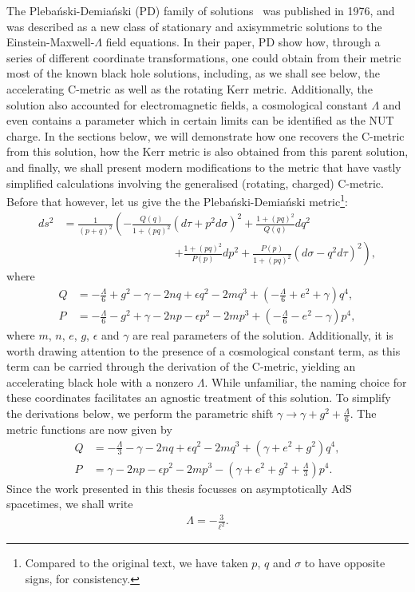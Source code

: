 \documentclass[
twoside,
openright,
frontopenright
]{dmathesis}
\newcommand{\nn}{\nonumber}
\begin{document}
The Pleba\'nski-Demia\'nski (PD) family of solutions~\cite{Plebanski:1976gy} was
published in 1976, and was described as a new class of stationary and
axisymmetric solutions to the Einstein-Maxwell-$\Lambda$ field equations. In
their paper, PD show how, through a series of different coordinate
transformations, one could obtain from their metric most of the known black hole
solutions, including, as we shall see below, the accelerating C-metric as well
as the rotating Kerr metric. Additionally, the solution also accounted for
electromagnetic fields, a cosmological constant $\Lambda$ and even contains a
parameter which in certain limits can be identified as the NUT charge. In the
sections below, we will demonstrate how one recovers the C-metric from this
solution, how the Kerr metric is also obtained from this parent solution, and
finally, we shall present modern modifications to the metric that have vastly
simplified calculations involving the generalised (rotating, charged)
C-metric. Before that however, let us give the the Pleba\'nski-Demia\'nski
metric\footnote{Compared to the original text, we have taken $p$, $q$ and
  $\sigma$ to have opposite signs, for consistency.}:
\begin{align}
  \label{eq:PD}
  ds^2 &= \frac{1}{(p + q)^2} \left( - \frac{Q(q)}{1+(pq)^2}(d\tau + p^2
         d\sigma)^2 + \frac{1+(pq)^2}{Q(q)}dq^2 \right.\nn\\
  &\hspace{10em}\left.+ \frac{1+(pq)^2}{P(p)}dp^2 +
         \frac{P(p)}{1+(pq)^2}(d\sigma - q^2 d\tau)^2 \right), 
\end{align}
where
\begin{align}
  Q &= -\frac{\Lambda}{6} + g^2 - \gamma - 2nq + \epsilon q^2 -
      2mq^3 + \left(-\frac{\Lambda}{6}+e^2+\gamma\right)q^4,\nn\\
  P &= -\frac{\Lambda}{6} - g^2 + \gamma - 2np - \epsilon p^2 -
      2mp^3 + \left(-\frac{\Lambda}{6}-e^2-\gamma\right)p^4,
\end{align}
where $m$, $n$, $e$, $g$, $\epsilon$ and $\gamma$ are real parameters of the
solution. Additionally, it is worth drawing attention to the presence of a
cosmological constant term, as this term can be carried through the derivation of
the C-metric, yielding an accelerating black hole with a nonzero
$\Lambda$. While unfamiliar, the naming choice for these coordinates facilitates
an agnostic treatment of this solution. To simplify the derivations below, we
perform the parametric shift $\gamma\to \gamma + g^2 +\frac{\Lambda}{6}$. The
metric functions are now given by
\begin{align}
  \label{eq:PDfn}
  Q &= -\frac{\Lambda}{3} - \gamma - 2nq + \epsilon q^2 -
      2mq^3 + \left(\gamma + e^2 + g^2\right)q^4,\nn\\
  P &=  \gamma - 2np - \epsilon p^2 -
      2mp^3 - \left(\gamma+e^2+g^2+\frac{\Lambda}{3}\right)p^4.
\end{align}
Since the work presented in this thesis focusses on asymptotically AdS
spacetimes, we shall write
\begin{align*}
  \Lambda=-\frac{3}{\ell^2}.
\end{align*}
\end{document}
